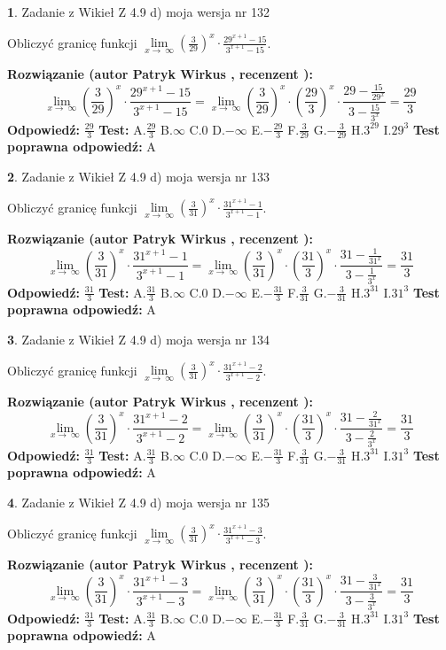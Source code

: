 \documentclass[12pt, a4paper]{article}
\theoremstyle{definition} %
\newtheorem{zad}{}
\newcommand{\zadStart}[1]{\begin{zad}#1\newline}
\newcommand{\zadStop}{\end{zad}}
\newcommand{\rozwStart}[2]{\noindent \textbf{Rozwiązanie (autor #1 , recenzent #2): }\newline}
\newcommand{\rozwStop}{\newline}
\newcommand{\odpStart}{\noindent \textbf{Odpowiedź:}\newline}
\newcommand{\odpStop}{\newline}
\newcommand{\testStart}{\noindent \textbf{Test:}\newline}
\newcommand{\testStop}{\newline}
\newcommand{\kluczStart}{\noindent \textbf{Test poprawna odpowiedź:}\newline}
\newcommand{\kluczStop}{\newline}
\begin{document}
\zadStart{Zadanie z Wikieł Z 4.9 d) moja wersja nr 132}


Obliczyć granicę funkcji  $\lim\limits_{x\to\ \infty}(\frac{3}{29})^{x}\cdot\frac{29^{x+1}-15}{3^{x+1}-15}$.
\zadStop
\rozwStart{Patryk Wirkus}{}
$$\lim\limits_{x\to\ \infty}(\frac{3}{29})^{x}\cdot\frac{29^{x+1}-15}{3^{x+1}-15}=\lim\limits_{x\to\ \infty}(\frac{3}{29})^{x}\cdot(\frac{29}{3})^{x} \cdot \frac{29-\frac{15}{29^{x}}}{3-\frac{15}{3^{x}}} = \frac{29}{3}$$
\rozwStop
\odpStart
$\frac{29}{3}$
\odpStop
\testStart
A.$\frac{29}{3}$ B.$\infty$ C.$0$ D.$-\infty$ E.$-\frac{29}{3}$
F.$\frac{3}{29}$ G.$-\frac{3}{29}$
H.$3^{29}$
I.$29^{3}$
\testStop
\kluczStart
A
\kluczStop



\zadStart{Zadanie z Wikieł Z 4.9 d) moja wersja nr 133}


Obliczyć granicę funkcji  $\lim\limits_{x\to\ \infty}(\frac{3}{31})^{x}\cdot\frac{31^{x+1}-1}{3^{x+1}-1}$.
\zadStop
\rozwStart{Patryk Wirkus}{}
$$\lim\limits_{x\to\ \infty}(\frac{3}{31})^{x}\cdot\frac{31^{x+1}-1}{3^{x+1}-1}=\lim\limits_{x\to\ \infty}(\frac{3}{31})^{x}\cdot(\frac{31}{3})^{x} \cdot \frac{31-\frac{1}{31^{x}}}{3-\frac{1}{3^{x}}} = \frac{31}{3}$$
\rozwStop
\odpStart
$\frac{31}{3}$
\odpStop
\testStart
A.$\frac{31}{3}$ B.$\infty$ C.$0$ D.$-\infty$ E.$-\frac{31}{3}$
F.$\frac{3}{31}$ G.$-\frac{3}{31}$
H.$3^{31}$
I.$31^{3}$
\testStop
\kluczStart
A
\kluczStop



\zadStart{Zadanie z Wikieł Z 4.9 d) moja wersja nr 134}


Obliczyć granicę funkcji  $\lim\limits_{x\to\ \infty}(\frac{3}{31})^{x}\cdot\frac{31^{x+1}-2}{3^{x+1}-2}$.
\zadStop
\rozwStart{Patryk Wirkus}{}
$$\lim\limits_{x\to\ \infty}(\frac{3}{31})^{x}\cdot\frac{31^{x+1}-2}{3^{x+1}-2}=\lim\limits_{x\to\ \infty}(\frac{3}{31})^{x}\cdot(\frac{31}{3})^{x} \cdot \frac{31-\frac{2}{31^{x}}}{3-\frac{2}{3^{x}}} = \frac{31}{3}$$
\rozwStop
\odpStart
$\frac{31}{3}$
\odpStop
\testStart
A.$\frac{31}{3}$ B.$\infty$ C.$0$ D.$-\infty$ E.$-\frac{31}{3}$
F.$\frac{3}{31}$ G.$-\frac{3}{31}$
H.$3^{31}$
I.$31^{3}$
\testStop
\kluczStart
A
\kluczStop



\zadStart{Zadanie z Wikieł Z 4.9 d) moja wersja nr 135}


Obliczyć granicę funkcji  $\lim\limits_{x\to\ \infty}(\frac{3}{31})^{x}\cdot\frac{31^{x+1}-3}{3^{x+1}-3}$.
\zadStop
\rozwStart{Patryk Wirkus}{}
$$\lim\limits_{x\to\ \infty}(\frac{3}{31})^{x}\cdot\frac{31^{x+1}-3}{3^{x+1}-3}=\lim\limits_{x\to\ \infty}(\frac{3}{31})^{x}\cdot(\frac{31}{3})^{x} \cdot \frac{31-\frac{3}{31^{x}}}{3-\frac{3}{3^{x}}} = \frac{31}{3}$$
\rozwStop
\odpStart
$\frac{31}{3}$
\odpStop
\testStart
A.$\frac{31}{3}$ B.$\infty$ C.$0$ D.$-\infty$ E.$-\frac{31}{3}$
F.$\frac{3}{31}$ G.$-\frac{3}{31}$
H.$3^{31}$
I.$31^{3}$
\testStop
\kluczStart
A
\kluczStop
\end{document}
